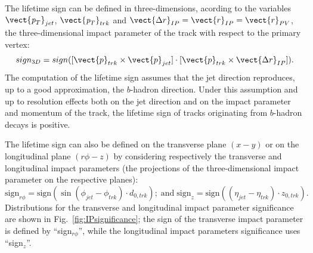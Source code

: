 The lifetime sign can be defined in three-dimensions, acording to the variables $\vect{\pt}_{jet}$, $\vect{\pt}_{trk}$ and $\vect{\Delta r}_{IP} = \vect{r}_{IP} = \vect{r}_{PV}$, the three-dimensional impact parameter of the track with respect to the primary vertex:
%
\begin{equation}
sign_{3D} = sign([\vect{p}_{trk} \times \vect{p}_{jet}]\cdot[\vect{p}_{trk} \times \vect{\Delta r}_{IP} ]).
\end{equation}
%
The computation of the lifetime sign assumes that the jet direction reproduces, up to a good approximation, the $b$-hadron direction. Under this assumption and up to resolution effects both on the jet direction and on the impact parameter and momentum of the track, the lifetime sign of tracks originating from $b$-hadron decays is positive.

The lifetime sign can also be defined on the transverse plane $(x-y)$ or on the longitudinal plane $(r\phi-z)$ by considering respectively the transverse and longitudinal impact parameters (the projections of the three-dimensional impact parameter on the respective planes):
%
\begin{equation}
\text{sign}_{r\phi} = \text{sign}(\sin(\phi_{jet} - \phi_{trk})\cdot d_{0,trk}); \; \text{and} \; \text{sign}_{z} = \text{sign}((\eta_{jet} - \eta_{trk})\cdot z_{0,trk}).
\end{equation}
%
Distributions for the transverse and longitudinal impact parameter significance are shown in Fig.~\ref{fig:IPsignificance}; the sign of the transverse impact parameter is defined by ``sign$_{r\phi}$'', while the longitudinal impact parameters significance uses ``sign$_z$''.  %


